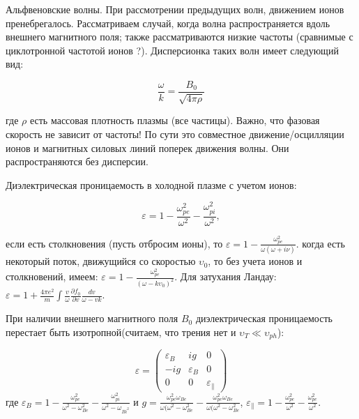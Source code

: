 \documentclass[10pt, a4paper]{article}
\begin{document}
Альфвеновские волны. При рассмотрении предыдущих волн, движением ионов пренебрегалось. Рассматриваем случай, когда волна распространяется вдоль внешнего магнитного поля; также рассматриваются низкие частоты (сравнимые с циклотронной частотой ионов ?). Дисперсионка таких волн имеет следующий вид:

\begin{equation}
    \frac{\omega}{k}=\frac{B_0}{\sqrt{4\pi \rho}}
\end{equation}

где $\rho$ есть массовая плотность плазмы (все частицы). Важно, что фазовая скорость не зависит от частоты! По сути это совместное движение/осцилляции ионов и магнитных силовых линий поперек движения волны. Они распространяются без дисперсии.

Диэлектрическая проницаемость в холодной плазме с учетом ионов:

\begin{equation}
	\varepsilon=1 - \frac{\omega_{pe}^2}{\omega^2} - \frac{\omega_{pi}^2}{\omega^2},
\end{equation}

если есть столкновения (пусть отбросим ионы), то $\varepsilon=1-\frac{\omega_{pe}^2}{\omega (\omega+i \nu)}$. когда есть некоторый поток, движущийся со скоростью $\upsilon_0$, то без учета ионов и столкновений, имеем: $\varepsilon=1-\frac{\omega_{pe}^2}{(\omega - k \upsilon_0)^2}$.
Для затухания Ландау: $\varepsilon=1+\frac{4\pi e^2}{m} \int \frac{v}{\omega} \frac{\partial f_0}{\partial v} \frac{dv}{\omega-vk}$.

При наличии внешнего магнитного поля $B_0$ диэлектрическая проницаемость перестает быть изотропной(считаем, что трения нет и $\upsilon_T \ll \upsilon_{ph}$):

\begin{equation}
	\varepsilon=
	\begin{pmatrix}
		\varepsilon_B & ig & 0 \\
		-ig & \varepsilon_B & 0 \\
		0 & 0 & \varepsilon_{\parallel}
	\end{pmatrix}
\end{equation}
где $\varepsilon_B=1-\frac{\omega_{pe}^2}{\omega^2-\omega_{Be}^2}-\frac{\omega_{pi}^2}{\omega^2-\omega_{Bi^2}}$ и $g=\frac{\omega_{pe}^2 \omega_{Be}}{\omega (\omega^2-\omega_{Be}^2} -\frac{\omega_{pe}^2 \omega_{Be}}{\omega (\omega^2-\omega_{Be}^2}$, $\varepsilon_{\parallel}=1-\frac{\omega_{pe}^2}{\omega^2}-\frac{\omega_{pe}^2}{\omega^2}$. 
\end{document}
